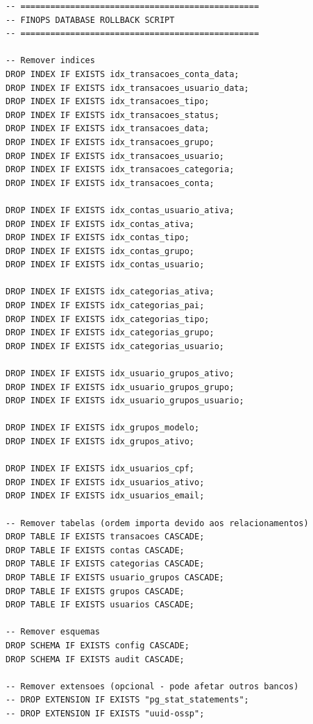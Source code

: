 \begin{lstlisting}[caption=Script para reverter instalacao]
-- ================================================
-- FINOPS DATABASE ROLLBACK SCRIPT
-- ================================================

-- Remover indices
DROP INDEX IF EXISTS idx_transacoes_conta_data;
DROP INDEX IF EXISTS idx_transacoes_usuario_data;
DROP INDEX IF EXISTS idx_transacoes_tipo;
DROP INDEX IF EXISTS idx_transacoes_status;
DROP INDEX IF EXISTS idx_transacoes_data;
DROP INDEX IF EXISTS idx_transacoes_grupo;
DROP INDEX IF EXISTS idx_transacoes_usuario;
DROP INDEX IF EXISTS idx_transacoes_categoria;
DROP INDEX IF EXISTS idx_transacoes_conta;

DROP INDEX IF EXISTS idx_contas_usuario_ativa;
DROP INDEX IF EXISTS idx_contas_ativa;
DROP INDEX IF EXISTS idx_contas_tipo;
DROP INDEX IF EXISTS idx_contas_grupo;
DROP INDEX IF EXISTS idx_contas_usuario;

DROP INDEX IF EXISTS idx_categorias_ativa;
DROP INDEX IF EXISTS idx_categorias_pai;
DROP INDEX IF EXISTS idx_categorias_tipo;
DROP INDEX IF EXISTS idx_categorias_grupo;
DROP INDEX IF EXISTS idx_categorias_usuario;

DROP INDEX IF EXISTS idx_usuario_grupos_ativo;
DROP INDEX IF EXISTS idx_usuario_grupos_grupo;
DROP INDEX IF EXISTS idx_usuario_grupos_usuario;

DROP INDEX IF EXISTS idx_grupos_modelo;
DROP INDEX IF EXISTS idx_grupos_ativo;

DROP INDEX IF EXISTS idx_usuarios_cpf;
DROP INDEX IF EXISTS idx_usuarios_ativo;
DROP INDEX IF EXISTS idx_usuarios_email;

-- Remover tabelas (ordem importa devido aos relacionamentos)
DROP TABLE IF EXISTS transacoes CASCADE;
DROP TABLE IF EXISTS contas CASCADE;
DROP TABLE IF EXISTS categorias CASCADE;
DROP TABLE IF EXISTS usuario_grupos CASCADE;
DROP TABLE IF EXISTS grupos CASCADE;
DROP TABLE IF EXISTS usuarios CASCADE;

-- Remover esquemas
DROP SCHEMA IF EXISTS config CASCADE;
DROP SCHEMA IF EXISTS audit CASCADE;

-- Remover extensoes (opcional - pode afetar outros bancos)
-- DROP EXTENSION IF EXISTS "pg_stat_statements";
-- DROP EXTENSION IF EXISTS "uuid-ossp";
\end{lstlisting}

